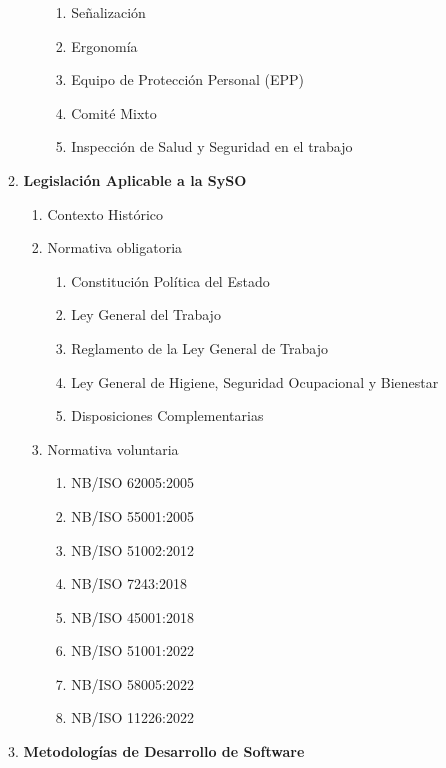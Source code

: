 \begin{enumerate}[label*=\arabic*.]
\begin{enumerate}[label*=\arabic*.]
\begin{enumerate}[label*=\arabic*.]
\begin{enumerate}[label*=\arabic*.]
                \item Señalización
                \item Ergonomía
                \item Equipo de Protección Personal (EPP)
                \item Comité Mixto
                \item Inspección de Salud y Seguridad en el trabajo
            \end{enumerate}
        \end{enumerate}
        \item \textbf{Legislación Aplicable a la SySO}
        \begin{enumerate}[label*=\arabic*.]
            \item Contexto Histórico
            \item Normativa obligatoria
            \begin{enumerate}[label*=\arabic*.]
                \item Constitución Política del Estado
                \item Ley General del Trabajo
                \item Reglamento de la Ley General de Trabajo
                \item Ley General de Higiene, Seguridad Ocupacional y Bienestar
                \item Disposiciones Complementarias
            \end{enumerate}
            \item Normativa voluntaria
            \begin{enumerate}[label*=\arabic*.]
                \item NB/ISO 62005:2005
                \item NB/ISO 55001:2005
                \item NB/ISO 51002:2012
                \item NB/ISO 7243:2018
                \item NB/ISO 45001:2018
                \item NB/ISO 51001:2022
                \item NB/ISO 58005:2022
                \item NB/ISO 11226:2022
            \end{enumerate}
        \end{enumerate}
        \item \textbf{Metodologías de Desarrollo de Software}
        \begin{enumerate}[label*=\arabic*.]

\end{enumerate}
\end{enumerate}
\end{enumerate}

